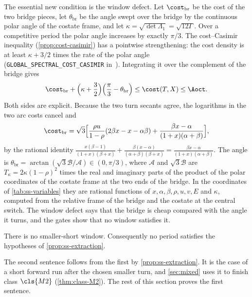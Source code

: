 The essential new condition is the window defect. Let $\cost_{\mathrm{br}}$ be the cost of the two
bridge pieces, let $\theta_{\mathrm{br}}$ be the angle swept over the bridge by the continuous
polar angle of the costate frame, and let $\kappa=\sqrt{\det\Lambda_1}=\sqrt{12\Gamma}$. Over a
competitive period the polar angle increases by exactly $\pi/3$. The cost–Casimir inequality
(\cref{prop:cost-casimir}) has a pointwise strengthening: the cost density is at least
$\kappa+3/2$ times the rate of the polar angle (\texttt{GLOBAL\_SPECTRAL\_COST\_CASIMIR}
in~\cite{Notes}). Integrating it over the complement of the bridge gives
\begin{equation}\label{eq:ss-defect}
  \cost_{\mathrm{br}}+\Bigl(\kappa+\frac32\Bigr)\Bigl(\frac\pi3-\theta_{\mathrm{br}}\Bigr)
  \le\cost(T,X)\le\Aoct .
\end{equation}
Both sides are explicit.
Because the two turn secants agree, the logarithms in the two arc costs cancel and
\begin{equation}\label{eq:ss-cost}
  \cost_{\mathrm{br}}=\sqrt3\Bigl[\frac{\rho u}{1-\rho}(2\beta x-x-\alpha\beta)
   +\frac{\beta x-\alpha}{(1+x)(\alpha+\beta)}\Bigr],
\end{equation}
by the rational identity
$\frac{x(\beta-1)}{(1+x)(\beta+x)}+\frac{\beta(x-\alpha)}{(\alpha+\beta)(\beta+x)}
=\frac{\beta x-\alpha}{(1+x)(\alpha+\beta)}$. The angle is
$\theta_{\mathrm{br}}=\arctan(\sqrt3\mathcal B/\mathcal A)\in(0,\pi/3)$, where $\mathcal A$ and
$\sqrt3\mathcal B$ are $T_\kappa=2\kappa(1-\rho)^2$ times the real and imaginary parts of the product of the polar
coordinates of the costate frame at the two ends of the bridge. In the coordinates of
\cref{tab:ss-variables} they are rational functions of $x,\alpha,\beta,\rho,u,v,E$ and $\kappa$,
computed from the relative frame of the bridge and the costate at the central switch. The window
defect says that the bridge is cheap
compared with the angle it turns, and the gates show that no window satisfies it.

\begin{theorem}\label{thm:m2-smaller-short}
There is no smaller-short window. Consequently no period
satisfies the hypotheses of \cref{prop:ss-extraction}.
\end{theorem}

The second sentence follows from the first by \cref{prop:ss-extraction}. It is the case of a short
forward run after the chosen smaller turn, and \cref{sec:mixed} uses it to finish class
$\cls{M2}$ (\cref{thm:class-M2}). The rest of this section proves the first sentence.

